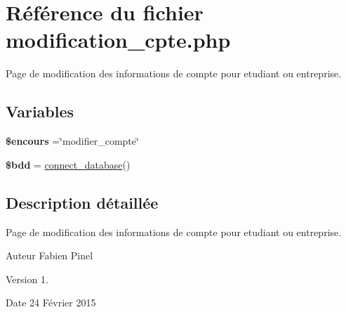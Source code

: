\hypertarget{modification__cpte_8php}{\section{Référence du fichier modification\-\_\-cpte.\-php}
\label{modification__cpte_8php}
}


Page de modification des informations de compte pour etudiant ou entreprise.  


\subsection*{Variables}
\begin{DoxyCompactItemize}
\item 
\hypertarget{modification__cpte_8php_af7b0e56292699e6983c24fbbf70ce08d}{{\bfseries \$encours} =\char`\"{}modifier\-\_\-compte\char`\"{}}\label{modification__cpte_8php_af7b0e56292699e6983c24fbbf70ce08d}

\item 
\hypertarget{modification__cpte_8php_a94f91e878bce0991e2cd595c5dd79b3f}{{\bfseries \$bdd} = \hyperlink{function_8php_a1f56f7efe8c1222675d8715c259957d5}{connect\-\_\-database}()}\label{modification__cpte_8php_a94f91e878bce0991e2cd595c5dd79b3f}

\end{DoxyCompactItemize}


\subsection{Description détaillée}
Page de modification des informations de compte pour etudiant ou entreprise. \begin{DoxyAuthor}{Auteur}
Fabien Pinel 
\end{DoxyAuthor}
\begin{DoxyVersion}{Version}
1. 
\end{DoxyVersion}
\begin{DoxyDate}{Date}
24 Février 2015 
\end{DoxyDate}
